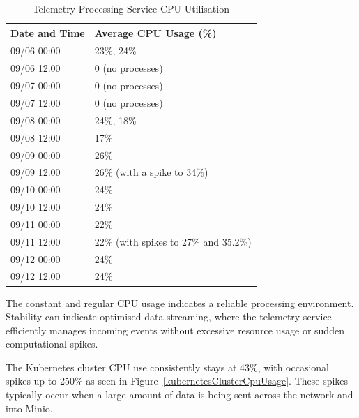 \documentclass[preprint,12pt]{elsarticle}
\begin{document}
\begin{table}[h!]
  \centering
  \begin{tabular}{|l|l|}
  \hline
  \textbf{Date and Time} & \textbf{Average CPU Usage (\%)}        \\ \hline
  09/06 00:00           & 23\%, 24\%                             \\ \hline
  09/06 12:00           & 0 (no processes)                       \\ \hline
  09/07 00:00           & 0 (no processes)                       \\ \hline
  09/07 12:00           & 0 (no processes)                       \\ \hline
  09/08 00:00           & 24\%, 18\%                             \\ \hline
  09/08 12:00           & 17\%                                   \\ \hline
  09/09 00:00           & 26\%                                   \\ \hline
  09/09 12:00           & 26\% (with a spike to 34\%)            \\ \hline
  09/10 00:00           & 24\%                                   \\ \hline
  09/10 12:00           & 24\%                                   \\ \hline
  09/11 00:00           & 22\%                                   \\ \hline
  09/11 12:00           & 22\% (with spikes to 27\% and 35.2\%)  \\ \hline
  09/12 00:00           & 24\%                                   \\ \hline
  09/12 12:00           & 24\%                                   \\ \hline
  \end{tabular}
  \caption{Telemetry Processing Service CPU Utilisation}
  \label{table:telemetry-cpu-usage}
\end{table}

The constant and regular CPU usage indicates a reliable processing environment. Stability can indicate optimised data streaming, where the telemetry service efficiently manages incoming events without excessive resource usage or sudden computational spikes. 

The Kubernetes cluster CPU use consistently stays at 43\%, with occasional spikes up to 250\% as seen in Figure~\ref{kubernetesClusterCpuUsage}. These spikes typically occur when a large amount of data is being sent across the network and into Minio.
\end{document}
